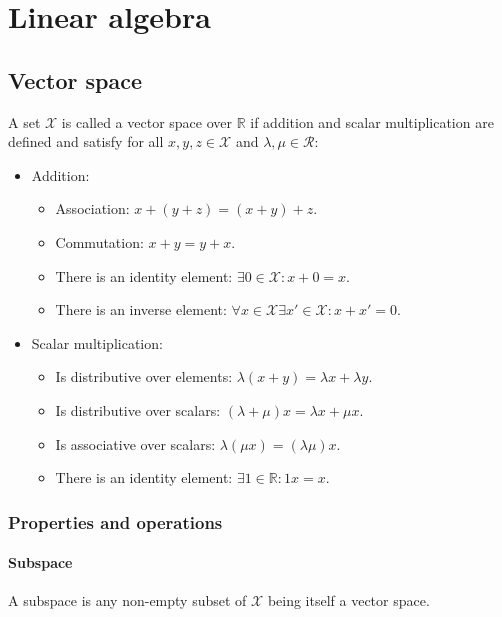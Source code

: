 \chapter{Linear algebra}

\section{Vector space}
A set $\mathcal{X}$ is called a vector space over $\mathbb{R}$ if addition and scalar multiplication are defined and satisfy for all $x,y,z\in\mathcal{X}$ and $\lambda,\mu\in\mathcal{R}$:

\begin{multicols}{2}
	\begin{itemize}
		\item Addition:
			\begin{itemize}
				\item Association: $x+(y+z) = (x+y)+z$.
				\item Commutation: $x+y = y+x$.
				\item There is an identity element: $\exists 0\in\mathcal{X}:x+0 = x$.
				\item There is an inverse element: $\forall x\in\mathcal{X} \exists x'\in\mathcal{X}:x+x'=0$.
			\end{itemize}
		\item Scalar multiplication:
			\begin{itemize}
				\item Is distributive over elements: $\lambda(x+y) = \lambda x + \lambda y$.
				\item Is distributive over scalars: $(\lambda+\mu)x = \lambda x + \mu x$.
				\item Is associative over scalars: $\lambda(\mu x) = (\lambda\mu)x$.
				\item There is an identity element: $\exists 1\in\mathbb{R}: 1x=x$.
			\end{itemize}
	\end{itemize}
\end{multicols}

	\subsection{Properties and operations}

		\subsubsection{Subspace}
		A subspace is any non-empty subset of $\mathcal{X}$ being itself a vector space.

